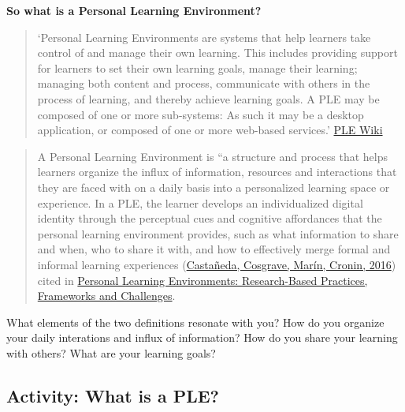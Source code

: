 \documentclass[
]{book}
\theoremstyle{definition}
\theoremstyle{definition}
\theoremstyle{definition}
\theoremstyle{definition}
\theoremstyle{remark}
\begin{document}
\textbf{So what is a Personal Learning Environment?}

\begin{quote}
`Personal Learning Environments are systems that help learners take control of and manage their own learning. This includes providing support for learners to set their own learning goals, manage their learning; managing both content and process, communicate with others in the process of learning, and thereby achieve learning goals. A PLE may be composed of one or more sub-systems: As such it may be a desktop application, or composed of one or more web-based services.' \href{https://edutechwiki.unige.ch/en/Personal_learning_environment}{PLE Wiki}
\end{quote}

\begin{quote}
A Personal Learning Environment is ``a structure and process that helps learners organize the influx of information, resources and interactions that they are faced with on a daily basis into a personalized learning space or experience. In a PLE, the learner develops an individualized digital identity through the perceptual cues and cognitive affordances that the personal learning environment provides, such as what information to share and when, who to share it with, and how to effectively merge formal and informal learning experiences (\href{https://naerjournal.ua.es/article/view/v6n1-introduction\#}{Castañeda, Cosgrave, Marín, Cronin, 2016}) cited in \href{https://naerjournal.ua.es/article/view/v6n1-introduction}{Personal Learning Environments: Research-Based Practices, Frameworks and Challenges}.
\end{quote}

What elements of the two definitions resonate with you? How do you organize your daily interations and influx of information? How do you share your learning with others? What are your learning goals?

\hypertarget{activity-what-is-a-ple}{%
\subsection*{Activity: What is a PLE?}\label{activity-what-is-a-ple}}
\end{document}
